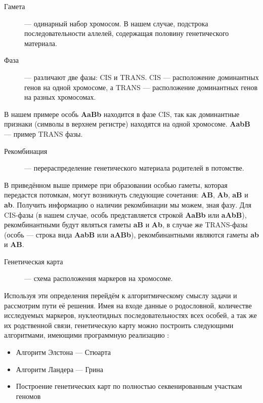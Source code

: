 \documentclass{matmex-diploma-custom}
\begin{document}
\begin{description}
\item[Гамета] --- одинарный набор хромосом. В нашем случае,
  подстрока последовательности аллелей, содержащая половину
  генетического материала.

\item[Фаза] --- различают две фазы: CIS и TRANS. CIS --- расположение
  доминантных генов на одной хромосоме, а TRANS --- расположение
  доминантных генов на разных хромосомах.
\end{description}
В нашем примере особь \textbf{AaBb} находится в фазе CIS, так как
доминантные признаки (символы в верхнем регистре) находятся на одной
хромосоме. \textbf{AabB} --- пример TRANS фазы.

\begin{description}
\item[Рекомбинация] --- перераспределение генетического материала
  родителей в потомстве.
\end{description}
В приведённом выше примере при образовании особью гаметы, которая
передастся потомкам, могут возникнуть следующие сочетания:
\textbf{AB}, \textbf{Ab}, \textbf{aB} и \textbf{ab}. Получить
информацию о наличии рекомбинации мы можем, зная фазу. Для CIS-фазы (в
нашем случае, особь представляется строкой \textbf{AaBb} или
\textbf{aAbB}), рекомбинантными будут являться гаметы \textbf{aB} и
\textbf{Ab}, в случае же TRANS-фазы (особь --- строка вида
\textbf{AabB} или \textbf{aABb}), рекомбинантными являются гаметы
\textbf{ab} и \textbf{AB}.

\begin{description}
\item[Генетическая карта] --- схема расположения маркеров на хромосоме.
\end{description}

Используя эти определения перейдём к алгоритмическому смыслу задачи и
рассмотрим пути её решения. Имея на входе данные о родословной,
количестве исследуемых маркеров, нуклеотидных последовательностях всех
особей, а так же их родственной связи, генетическую карту можно
построить следующими алгоритмами, имеющими программную реализацию
\cite{fishelson2002exact}:
\begin{itemize}
\item Алгоритм Элстона --- Стюарта
\item Алгоритм Ландера --- Грина
\item Построение генетических карт по полностью секвенированным
  участкам геномов
\end{itemize}
\end{document}
